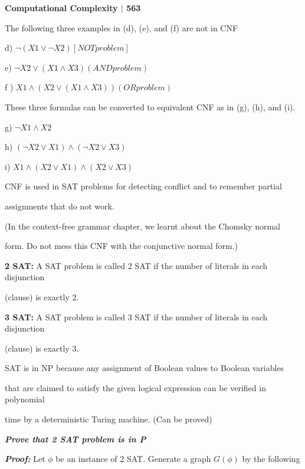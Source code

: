 \documentclass[10pt,a4paper]{book}
\begin{document}
\small

\begin{flushright}
  \textsf{\textbf{Computational Complexity $|$ 563}}
\end{flushright}

The following three examples in (d), (e), and (f) are not in CNF

\quad

\quad d) $\neg (X1 \vee \neg X2) [NOT problem]$

\quad e) $\neg X2 \vee (X1 \wedge X3) (AND problem)$

\quad f ) $X1 \wedge (X2 \vee (X1 \wedge X3)) (OR problem)$

\quad

These three formulas can be converted to equivalent CNF as in (g), (h), and (i).

\quad

\quad g) $\neg X1 \wedge X2$

\quad h) $(\neg X2 \vee X1) \wedge (\neg X2 \vee X3)$

\quad i) $X1 \wedge (X2 \vee X1) \wedge (X2 \vee X3)$

\quad

CNF is used in SAT problems for detecting conflict and to remember partial

assignments that do not work.

\quad(In the context-free grammar chapter, we learnt about the Chomsky normal

form. Do not mess this CNF with the conjunctive normal form.)

\quad

\textsf{\textbf{2 SAT:}} A SAT problem is called 2 SAT if the number of literals in each disjunction 

(clause) is exactly 2.

\textsf{\textbf{3 SAT:}} A SAT problem is called 3 SAT if the number of literals in each disjunction

(clause) is exactly 3.

\quad SAT is in NP because any assignment of Boolean values to Boolean variables 

that are claimed to satisfy the given logical expression can be verified in polynomial
 
time by a deterministic Turing machine. (Can be proved)

\;

\textsl{\textbf{Prove that 2 SAT problem is in P}}

\textsl{\textbf{Proof:}} Let $\phi$ be an instance of 2 SAT. Generate a graph $G(\phi)$ by the following 
\end{document}
